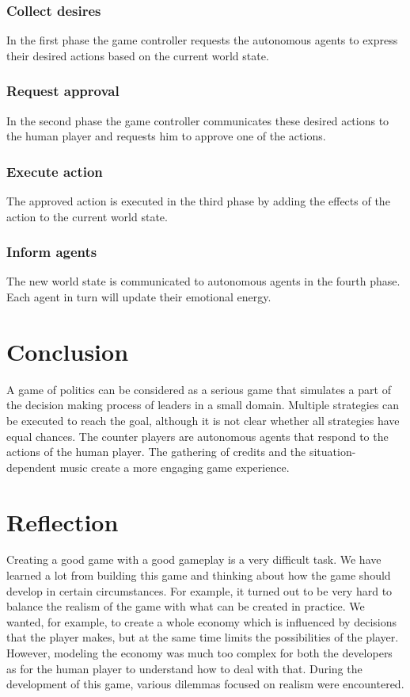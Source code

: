 \documentclass[11pt,a4paper]{article}
\begin{document}
    \subsubsection{Collect desires}
      In the first phase the game controller requests the autonomous agents to express their desired actions based on the current world state.
    \subsubsection{Request approval}
      In the second phase the game controller communicates these desired actions to the human player and requests him to approve one of the actions.
    \subsubsection{Execute action}
      The approved action is executed in the third phase by adding the effects of the action to the current world state.
    \subsubsection{Inform agents}
      The new world state is communicated to autonomous agents in the fourth phase. Each agent in turn will update their emotional energy. 

\section{Conclusion}
A game of politics can be considered as a serious game that simulates a part of the decision making process of leaders in a small domain. Multiple strategies can be executed to reach the goal, although it is not clear whether all strategies have equal chances. The counter players are autonomous agents that respond to the actions of the human player. The gathering of credits and the situation-dependent music create a more engaging game experience.

\section{Reflection}
Creating a good game with a good gameplay is a very difficult task. We have learned a lot from building this game and thinking about how the game should develop in certain circumstances. For example, it turned out to be very hard to balance the realism of the game with what can be created in practice. We wanted, for example, to create a whole economy which is influenced by decisions that the player makes, but at the same time limits the possibilities of the player. However, modeling the economy was much too complex for both the developers as for the human player to understand how to deal with that. During the development of this game, various dilemmas focused on realism were encountered. 
\end{document}
